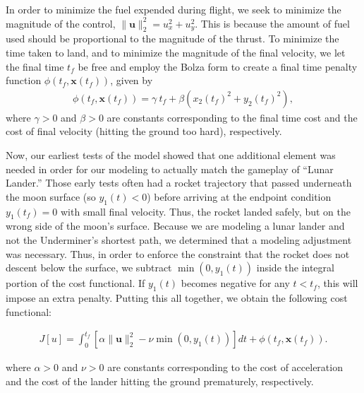\documentclass{article}
\begin{document}
In order to minimize the fuel expended during flight, we seek to minimize the magnitude of the control, $\|\mathbf{u}\|_2^2 = u_x^2 + u_y^2$. This is because the amount of fuel used should be proportional to the magnitude of the thrust. To minimize the time taken to land, and to minimize the magnitude of the final velocity, we let the final time $t_f$ be free and employ the Bolza form to create a final time penalty function $\phi(t_f, \mathbf{x}(t_f))$, given by
\begin{align}
\phi(t_f, \mathbf{x}(t_f)) = \gamma\ t_f + \beta\left(x_2(t_f)^2 + y_2(t_f)^2\right),
\end{align} 
where $\gamma > 0$ and $\beta > 0$ are constants corresponding to the final time cost and the cost of final velocity (hitting the ground too hard), respectively.

Now, our earliest tests of the model showed that one additional element was needed in order for our modeling to actually match the gameplay of ``Lunar Lander.''
Those early tests often had a rocket trajectory that passed underneath the moon surface (so $y_1(t) < 0$) before arriving at the endpoint condition $y_1(t_f) = 0$ with small final velocity. Thus, the rocket landed safely, but on the wrong side of the moon's surface. Because we are modeling a lunar lander and not the Underminer's shortest path, we determined that a modeling adjustment was necessary. Thus, in order to enforce the constraint that the rocket does not descent below the surface, we subtract $\min(0, y_1(t))$ inside the integral portion of the cost functional. If $y_1(t)$ becomes negative for any $t < t_f$, this will impose an extra penalty. 
Putting this all together, we obtain the following cost functional:

\begin{align}\label{cost-functional}
    J[u] = \int_{0}^{t_f} \left[\alpha \|\mathbf{u}\|_2^2 - \nu\min(0, y_1(t))\right] dt + \phi(t_f, \mathbf{x}(t_f)).
\end{align}
\vspace{0cm}

where $\alpha>0$ and $\nu>0$ are constants corresponding to the cost of acceleration and the cost of the lander hitting the ground prematurely, respectively. 

\end{document}
